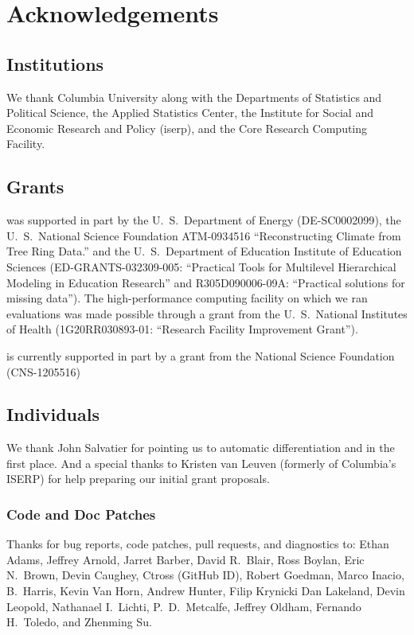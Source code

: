\chapter*{Acknowledgements}

\section*{Institutions}

We thank Columbia University along with the Departments of
Statistics and Political Science, the Applied Statistics Center, the
Institute for Social and Economic Research and Policy ({\sc iserp}),
and the Core Research Computing Facility.

\section*{Grants}

\Stan was supported in part by 
%
the U.~S.\ Department of Energy 
({\small DE-SC0002099}), 
%
the U.~S.\ National Science Foundation 
{\small ATM-0934516}
``Reconstructing Climate from Tree Ring Data.''
and 
%
the U.~S.\ Department of Education Institute of Education Sciences 
({\small ED-GRANTS-032309-005}:
 ``Practical Tools for Multilevel Hierarchical Modeling in Education
 Research'' and
 {\small R305D090006-09A}:
 ``Practical solutions for missing data'').
%
The high-performance computing
facility on which we ran evaluations was made possible through 
a grant from the U.~S.\ National Institutes of Health 
({\small 1G20RR030893-01}:
 ``Research Facility Improvement Grant'').

\Stan is currently supported in part by a grant from the National
Science Foundation (CNS-1205516)

\section*{Individuals}

We thank John Salvatier for pointing us to automatic differentiation
and \HMC in the first place.  And a special thanks to Kristen van
Leuven (formerly of Columbia's ISERP) for help preparing our initial
grant proposals.

\subsection*{Code  and Doc Patches}

Thanks for bug reports, code patches, pull requests, and diagnostics
to: 
Ethan Adams, 
Jeffrey Arnold, 
Jarret Barber, 
David R.~Blair, 
Ross Boylan, 
Eric N.~Brown, 
Devin Caughey, 
Ctross (GitHub ID), 
Robert Goedman, 
Marco Inacio, 
B.~Harris, 
Kevin Van Horn, 
Andrew Hunter, 
Filip Krynicki
Dan Lakeland, 
Devin Leopold, 
Nathanael I.~Lichti, 
P.~D.~Metcalfe, 
Jeffrey Oldham, 
Fernando H.~Toledo, 
and Zhenming Su.

